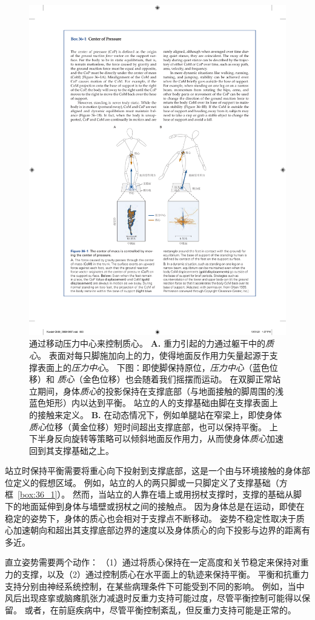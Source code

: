 \begin{figure}[htbp]
	\centering
	\includegraphics[width=0.65\linewidth]{chap36/fig_36_1}
	\caption{通过移动压力中心来控制质心。
		\textbf{A.} 重力引起的力通过躯干中的\textit{质心}。 
		表面对每只脚施加向上的力，使得地面反作用力矢量起源于支撑表面上的\textit{压力中心}。 
		下图：即使脚保持原位，\textit{压力中心}（蓝色位移）和 \textit{质心}（金色位移）也会随着我们摇摆而运动。
		在双脚正常站立期间，身体\textit{质心}的投影保持在支撑底部（与地面接触的脚周围的浅蓝色矩形）内以达到平衡。
		站立的人的支撑基础由脚在支撑表面上的接触来定义。
		\textbf{B.} 在动态情况下，例如单腿站在窄梁上，即使身体\textit{质心}位移（黄金位移）短时间超出支撑底部，也可以保持平衡。
		上下半身反向旋转等策略可以倾斜地面反作用力，从而使身体\textit{质心}加速回到其支撑基础之上\cite{otten1999balancing}。}
	\label{fig:36_1}
\end{figure}


站立时保持平衡需要将重心向下投射到支撑底部，这是一个由与环境接触的身体部位定义的假想区域。
例如，站立的人的两只脚或一只脚定义了支撑基础（方框~\ref{box:36_1}）。
然而，当站立的人靠在墙上或用拐杖支撑时，支撑的基础从脚下的地面延伸到身体与墙壁或拐杖之间的接触点。
因为身体总是在运动，即使在稳定的姿势下，身体的质心也会相对于支撑点不断移动。
姿势不稳定性取决于质心加速朝向和超出其支撑底部边界的速度以及身体质心的向下投影与边界的距离有多近。


直立姿势需要两个动作：
（1）通过将质心保持在一定高度和关节稳定来保持对重力的支撑，以及（2）通过控制质心在水平面上的轨迹来保持平衡。
平衡和抗重力支持分别由神经系统控制，在某些病理条件下可能受到不同的影响。
例如，当中风后出现痉挛或脑瘫肌张力减退时反重力支持可能过度，尽管平衡控制可能得以保留。
或者，在前庭疾病中，尽管平衡控制紊乱，但反重力支持可能是正常的。


